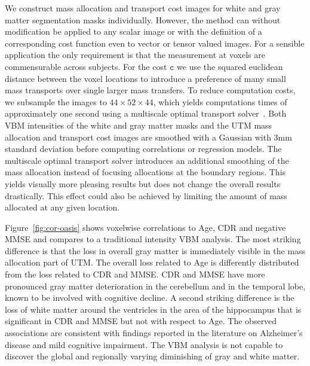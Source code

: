 \documentclass{llncs}
\newcommand{\cost}[0]{\mathtt{c}}
\begin{document}
We construct mass allocation and transport cost images for white and gray
matter segmentation masks individually. However, the method can without
modification be applied to any scalar image or with the definition of a
corresponding cost function even to vector or tensor valued images. For a
sensible application the only requirement is that the measurement at voxels are
commensurable across subjects. For the cost $\cost$ we use the squared
euclidean distance between the voxel locations to introduce a preference of
many small mass transports over single larger mass transfers.  To reduce
computation costs, we subsample the images to $44 \times 52 \times 44$, which
yields computations times of approximately one second using a multiscale
optimal transport solver~\cite{gerber2017multiscale}. Both VBM intensities of
the white and gray matter masks and the UTM mass allocation and transport cost
images are smoothed with a Gaussian with 3mm standard deviation before
computing correlations or regression models. The multiscale optimal transport
solver introduces an additional smoothing of the mass allocation instead of
focusing allocations at the boundary regions. This yields visually more
pleasing results but does not change the overall results drastically. This
effect could also be achieved by limiting the amount of mass allocated at any
given location.


Figure~\ref{fig:cor-oasis} shows voxelwise correlations to Age, CDR and
negative MMSE and compares to a traditional intensity VBM analysis. The most
striking difference is that the loss in overall gray matter is immediately
visible in the mass allocation part of UTM. The overall loss related to Age is
differently distributed from the loss related to CDR and MMSE. CDR and MMSE
have more pronounced gray matter deterioration in the cerebellum and in the
temporal lobe, known to be involved with cognitive decline. A second striking
difference is the loss of white matter around the ventricles in the area of the
hippocampus that is significant in CDR and MMSE but not with respect to Age.
The observed associations are consistent with findings reported in the
literature on Alzheimer's disease and mild cognitive impairment.  The VBM
analysis is not capable to discover the global and regionally varying
diminishing of gray and white matter. 
\end{document}
